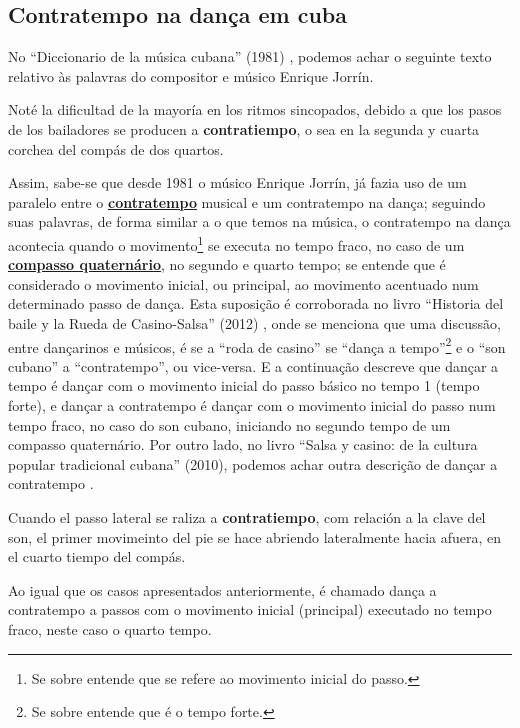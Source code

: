 \subsection{Contratempo na dança em cuba}
\label{subsec:contratempocuba}
No ``Diccionario de la música cubana'' (1981) 
\cite[pp. 113]{orovio1981diccionario} \cite[pp. 57]{santana2005merengue},
podemos achar o seguinte texto relativo às palavras do compositor e músico Enrique Jorrín.
\begin{citando}
Noté la dificultad de la mayoría en los ritmos sincopados, 
debido a que los pasos de los bailadores se producen a \textbf{contratiempo},
o sea en la segunda y cuarta corchea del compás de dos quartos.
\end{citando}
Assim, sabe-se que desde 1981 o músico Enrique Jorrín, 
já fazia uso de um paralelo entre o \hyperref[sec:contratempo]{\textbf{contratempo}} 
musical e um contratempo na dança;
seguindo suas palavras, de forma similar a o que temos na música, o contratempo na dança acontecia
quando o movimento\footnote{Se sobre entende que se refere ao movimento inicial do passo.} se executa no tempo fraco, 
no caso de um \hyperref[subsec:compassoquaternario]{\textbf{compasso quaternário}},
no segundo e quarto tempo;
se entende que é considerado o movimento inicial, ou principal, 
ao movimento acentuado num determinado passo de dança.
Esta suposição é corroborada no livro ``Historia del baile y la Rueda de Casino-Salsa'' (2012) \cite{borges2012historia},
onde se menciona que uma discussão, entre dançarinos e músicos,
é se a ``roda de casino'' se ``dança a tempo''\footnote{Se sobre entende que é o tempo forte.} 
e o ``son cubano'' a ``contratempo'',
ou vice-versa. E a continuação descreve que dançar a tempo
é dançar com o movimento inicial do passo básico no tempo 1 (tempo forte),
e dançar a contratempo é dançar com o movimento inicial do passo num tempo fraco, 
no caso do son cubano, iniciando no segundo tempo de um compasso quaternário.
Por outro lado, no livro ``Salsa y casino: de la cultura popular tradicional cubana'' (2010),
podemos achar outra descrição de dançar a contratempo \cite[pp. 63]{gutierrez2010salsa}.
\begin{citando}
Cuando el passo lateral se raliza a \textbf{contratiempo},
com relación a la clave del son,
el primer movimeinto del pie se hace abriendo lateralmente hacia afuera,
en el cuarto tiempo del compás.
\end{citando}
Ao igual que os casos apresentados anteriormente,
é chamado dança a contratempo a passos com o movimento inicial (principal) executado no tempo fraco,
neste caso o quarto tempo.

